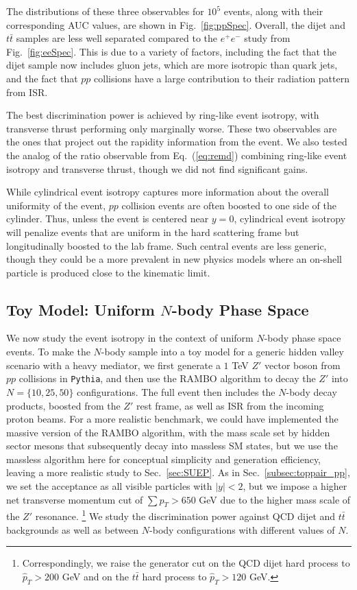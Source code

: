 \documentclass[letterpaper,11pt]{article}
\DeclareRobustCommand{\Sec}[1]{Sec.~\ref{#1}}
\DeclareRobustCommand{\Fig}[1]{Fig.~\ref{#1}}
\DeclareRobustCommand{\Eq}[1]{Eq.~(\ref{#1})}
\begin{document}
The distributions of these three observables for $10^5$ events, along with their corresponding AUC values, are shown in \Fig{fig:ppSpec}.
%
Overall, the dijet and $t\bar{t}$ samples are less well separated compared to the $e^+e^-$ study from \Fig{fig:eeSpec}.
%
This is due to a variety of factors, including the fact that the dijet sample now includes gluon jets, which are more isotropic than quark jets, and the fact that $pp$ collisions have a large contribution to their radiation pattern from ISR.


The best discrimination power is achieved by ring-like event isotropy, with transverse thrust performing only marginally worse.
%
These two observables are the ones that project out the rapidity information from the event.
%
We also tested the analog of the ratio observable from \Eq{eq:remd} combining ring-like event isotropy and transverse thrust, though we did not find significant gains.


While cylindrical event isotropy captures more information about the overall uniformity of the event, $pp$ collision events are often boosted to one side of the cylinder.
%
Thus, unless the event is centered near $y = 0$, cylindrical event isotropy will penalize events that are uniform in the hard scattering frame but longitudinally boosted to the lab frame.
%
Such central events are less generic, though they could be a more prevalent in new physics models where an on-shell particle is produced close to the kinematic limit.



\subsection{Toy Model: Uniform $N$-body Phase Space}
\label{subsec:uniformNbody_pp}


We now study the event isotropy in the context of uniform $N$-body phase space events.
%
To make the $N$-body sample into a toy model for a generic hidden valley scenario with a heavy mediator, we first generate a $1$ TeV $Z'$ vector boson from $pp$ collisions in \texttt{Pythia}, and then use the RAMBO algorithm to decay the $Z'$ into $N = \{10, 25, 50\}$ configurations.
%
The full event then includes the $N$-body decay products, boosted from the $Z'$ rest frame, as well as ISR from the incoming proton beams.
%
For a more realistic benchmark, we could have implemented the massive version of the RAMBO algorithm, with the mass scale set by hidden sector mesons that subsequently decay into massless SM states, but we use the massless algorithm here for conceptual simplicity and generation efficiency, leaving a more realistic study to \Sec{sec:SUEP}.
%
As in \Sec{subsec:toppair_pp}, we set the acceptance as all visible particles with $|y|<2$,
%
but we impose a higher net transverse momentum cut of $\sum p_T > 650$ GeV due to the higher mass scale of the $Z'$ resonance.%
%
\footnote{Correspondingly, we raise the generator cut on the QCD dijet hard process to $\hat{p}_T > 200$ GeV and on the $t\bar{t}$ hard process to $\hat{p}_T>120$ GeV.}
%
We study the discrimination power against QCD dijet and $t\bar{t}$ backgrounds as well as between $N$-body configurations with different values of $N$.
\end{document}
